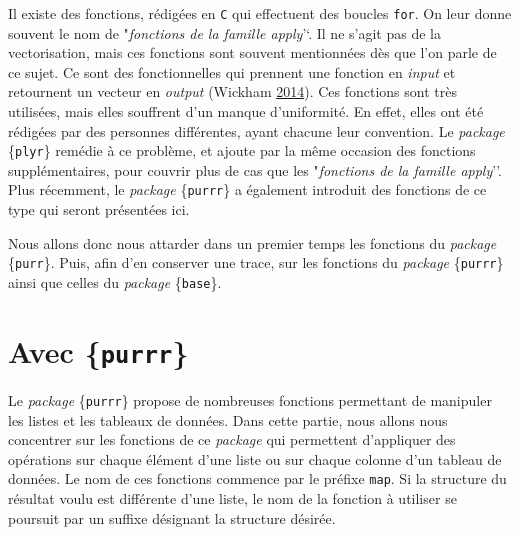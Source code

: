 \documentclass[
  11pt,
]{book}
\numberwithin{equation}{section}
\numberwithin{countremarque}{section}
\begin{document}
Il existe des fonctions, rédigées en \texttt{C} qui effectuent des boucles \texttt{for}. On leur donne souvent le nom de "\emph{fonctions de la famille apply}'`. Il ne s'agit pas de la vectorisation, mais ces fonctions sont souvent mentionnées dès que l'on parle de ce sujet. Ce sont des fonctionnelles qui prennent une fonction en \emph{input} et retournent un vecteur en \emph{output} (Wickham \protect\hyperlink{ref-Wickham_2014_Advanced_R_Functionals}{2014}). Ces fonctions sont très utilisées, mais elles souffrent d'un manque d'uniformité. En effet, elles ont été rédigées par des personnes différentes, ayant chacune leur convention. Le \emph{package} \{\texttt{plyr}\} remédie à ce problème, et ajoute par la même occasion des fonctions supplémentaires, pour couvrir plus de cas que les "\emph{fonctions de la famille apply}''. Plus récemment, le \emph{package} \{\texttt{purrr}\} a également introduit des fonctions de ce type qui seront présentées ici.

Nous allons donc nous attarder dans un premier temps les fonctions du \emph{package} \{\texttt{purr}\}. Puis, afin d'en conserver une trace, sur les fonctions du \emph{package} \{\texttt{purrr}\} ainsi que celles du \emph{package} \{\texttt{base}\}.

\hypertarget{boucles_vectorisation_purrr}{%
\section{\texorpdfstring{Avec \{\texttt{purrr}\}}{Avec \{purrr\}}}\label{boucles_vectorisation_purrr}}

Le \emph{package} \{\texttt{purrr}\} propose de nombreuses fonctions permettant de manipuler les listes et les tableaux de données. Dans cette partie, nous allons nous concentrer sur les fonctions de ce \emph{package} qui permettent d'appliquer des opérations sur chaque élément d'une liste ou sur chaque colonne d'un tableau de données. Le nom de ces fonctions commence par le préfixe \texttt{map}. Si la structure du résultat voulu est différente d'une liste, le nom de la fonction à utiliser se poursuit par un suffixe désignant la structure désirée.
\end{document}
